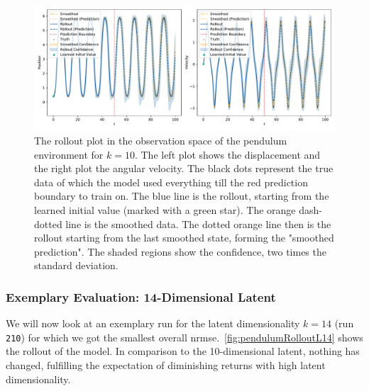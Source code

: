 			\begin{figure}
				\centering
				\includegraphics[width=\linewidth]{figures/results/pendulum/run-latent-dim-10/rollout-observations-N0.pdf}
				\caption{The rollout plot in the observation space of the pendulum environment for \(k = 10\). The left plot shows the displacement and the right plot the angular velocity. The black dots represent the true data of which the model used everything till the red prediction boundary to train on. The blue line is the rollout, starting from the learned initial value (marked with a green star). The orange dash-dotted line is the smoothed data. The dotted orange line then is the rollout starting from the last smoothed state, forming the "smoothed prediction". The shaded regions show the confidence, \ie two times the standard deviation.}
				\label{fig:pendulumRolloutL10}
			\end{figure}

		\subsubsection{Exemplary Evaluation: 14-Dimensional Latent}
			\label{subsubsec:pendulumL14}

			We will now look at an exemplary run for the latent dimensionality \( k = 14 \) (run \texttt{210}) for which we got the smallest overall \ac{nrmse}.~\autoref{fig:pendulumRolloutL14} shows the rollout of the model. In comparison to the 10-dimensional latent, nothing has changed, fulfilling the expectation of diminishing returns with high latent dimensionality.

